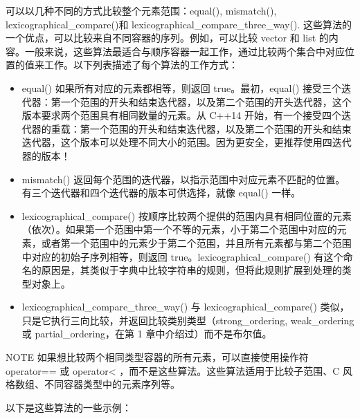 可以以几种不同的方式比较整个元素范围：equal(), mismatch(), lexicographical\_compare()和 lexicographical\_compare\_three\_way(). 这些算法的一个优点，可以比较来自不同容器的序列。例如，可以比较 vector 和 list 的内容。一般来说，这些算法最适合与顺序容器一起工作，通过比较两个集合中对应位置的值来工作。以下列表描述了每个算法的工作方式：

\begin{itemize}
\item
equal() 如果所有对应的元素都相等，则返回 true。最初，equal() 接受三个迭代器：第一个范围的开头和结束迭代器，以及第二个范围的开头迭代器，这个版本要求两个范围具有相同数量的元素。从 C++14 开始，有一个接受四个迭代器的重载：第一个范围的开头和结束迭代器，以及第二个范围的开头和结束迭代器，这个版本可以处理不同大小的范围。因为更安全，更推荐使用四迭代器的版本！

\item
mismatch() 返回每个范围的迭代器，以指示范围中对应元素不匹配的位置。有三个迭代器和四个迭代器的版本可供选择，就像 equal() 一样。

\item
lexicographical\_compare() 按顺序比较两个提供的范围内具有相同位置的元素（依次）。如果第一个范围中第一个不等的元素，小于第二个范围中对应的元素，或者第一个范围中的元素少于第二个范围，并且所有元素都与第二个范围中对应的初始子序列相等，则返回 true。lexicographical\_compare() 有这个命名的原因是，其类似于字典中比较字符串的规则，但将此规则扩展到处理的类型对象上。

\item
lexicographical\_compare\_three\_way() 与 lexicographical\_compare() 类似，只是它执行三向比较，并返回比较类别类型（strong\_ordering, weak\_ordering 或 partial\_ordering，在第 1 章中介绍过）而不是布尔值。
\end{itemize}

\begin{myNotic}{NOTE}
如果想比较两个相同类型容器的所有元素，可以直接使用操作符operator== 或 operator< ，而不是这些算法。这些算法适用于比较子范围、C 风格数组、不同容器类型中的元素序列等。
\end{myNotic}

以下是这些算法的一些示例：

